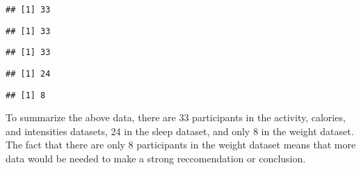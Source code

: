 \documentclass[
]{article}
\newenvironment{Shaded}{\begin{snugshade}}{\end{snugshade}}
\newcommand{\FunctionTok}[1]{\textcolor[rgb]{0.13,0.29,0.53}{\textbf{#1}}}
\newcommand{\NormalTok}[1]{#1}
\newcommand{\SpecialCharTok}[1]{\textcolor[rgb]{0.81,0.36,0.00}{\textbf{#1}}}
\begin{document}
\begin{Shaded}
\end{Shaded}

\begin{verbatim}
## [1] 33
\end{verbatim}

\begin{Shaded}
\end{Shaded}

\begin{verbatim}
## [1] 33
\end{verbatim}

\begin{Shaded}
\end{Shaded}

\begin{verbatim}
## [1] 33
\end{verbatim}

\begin{Shaded}
\end{Shaded}

\begin{verbatim}
## [1] 24
\end{verbatim}

\begin{Shaded}
\end{Shaded}

\begin{verbatim}
## [1] 8
\end{verbatim}

To summarize the above data, there are 33 participants in the activity,
calories, and intensities datasets, 24 in the sleep dataset, and only 8
in the weight dataset. The fact that there are only 8 participants in
the weight dataset means that more data would be needed to make a strong
reccomendation or conclusion.
\end{document}
